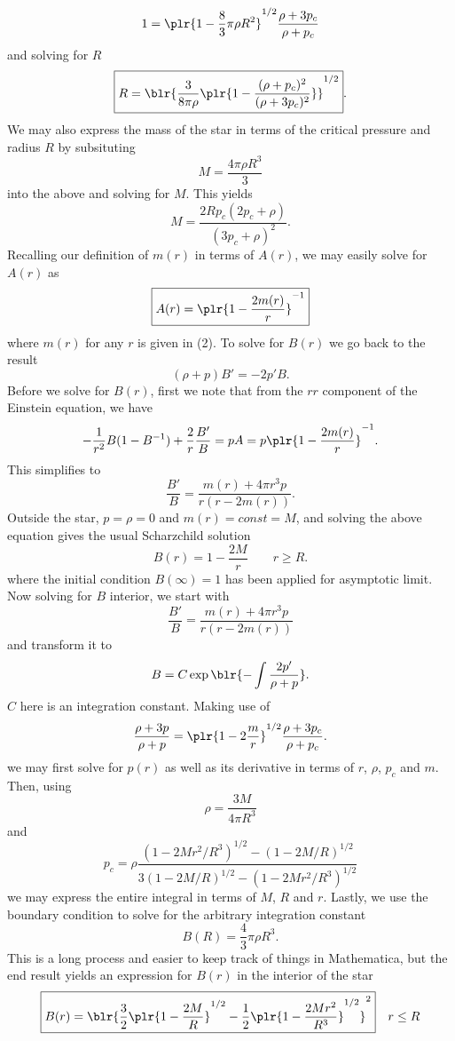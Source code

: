 \documentclass[10pt,letterpaper]{article}
\begin{document}
\[
	1 = \plr{ 1-\frac 83\pi \rho R^2}^{1/2}\frac{\rho+3p_c}{\rho+p_c}
\]
and solving for $R$
\[
	\boxed{R = \blr{\frac{3}{8\pi\rho}\plr{ 1- \frac{(\rho+p_c)^2}{(\rho+3p_c)^2}}}^{1/2}}.
\]
We may also express the mass of the star in terms of the critical pressure and radius $R$ by subsituting
\[
	M = \frac{4\pi\rho R^3}{3}
\]
into the above and solving for $M$. This yields
\[
	\boxed{M = \frac{2Rp_c(2p_c+\rho)}{(3p_c+\rho)^2}}.
\]
Recalling our definition of $m(r)$ in terms of $A(r)$, we may easily solve for $A(r)$ as
\[
	\boxed{A(r) = \plr{ 1-\frac{2m(r)}{r}}^{-1}}
\]
where $m(r)$ for any $r$ is given in (2). To solve for $B(r)$ we go back to the result 
\[
	(\rho+p)B' = -2p'B.
\]
Before we solve for $B(r)$, first we note that from the $rr$ component of the Einstein equation, we have
\[
	-\frac{1}{r^2}B(1-B^{-1}) +\frac{2}{r}\frac{B'}{B} = pA = p \plr{ 1-\frac{2m(r)}{r}}^{-1}.
\]	
This simplifies to 
\[
	\frac{B'}{B} = \frac{m(r)+4\pi r^3p}{r(r-2m(r))}.
\]
Outside the star, $p=\rho =0$ and $m(r) = const = M$, and solving the above equation gives the usual Scharzchild
solution
\[
	B(r) = 1-\frac{2M}{r}\qquad r\ge R.
\]
where the initial condition $B(\infty) = 1$ has been applied for asymptotic limit. Now solving for $B$ interior, 
we start with 
\[
	\frac{B'}{B} = \frac{m(r)+4\pi r^3p}{r(r-2m(r))}
\]
and transform it to
\[
	B = C\exp\blr{ -\int \frac{2p'}{\rho+p}}.
\]
$C$ here is an integration constant. Making use of 
\[
	\frac{\rho+3p}{\rho+p} = \plr{ 1-2\frac mr}^{1/2}\frac{\rho+3p_c}{\rho+p_c}.
\]
we may first solve for $p(r)$ as well as its derivative in terms of $r$, $\rho$, $p_c$ and $m$. Then, using
\[
	\rho = \frac{3M}{4\pi R^3}
\]
and 
\[
	p_c = \rho\frac{(1-2Mr^2/R^3)^{1/2}-(1-2M/R)^{1/2}}{3(1-2M/R)^{1/2}-(1-2Mr^2/R^3)^{1/2}}
\]
we may express the entire integral in terms of $M$, $R$ and $r$. Lastly, we use the boundary condition to solve for the arbitrary integration constant 
\[
	B(R) = \frac{4}{3}\pi \rho R^3.
\]
This is a long process and easier to keep track of things in Mathematica, but the end result yields an expression for
$B(r)$ in the interior of the star
\[
	\boxed{B(r) = \blr{ \frac32\plr{1-\frac{2M}{R}}^{1/2} - \frac12 \plr{1-\frac{2Mr^2}{R^3}}^{1/2}}^2}\quad r\le R
\]
\eenum
\end{document}
